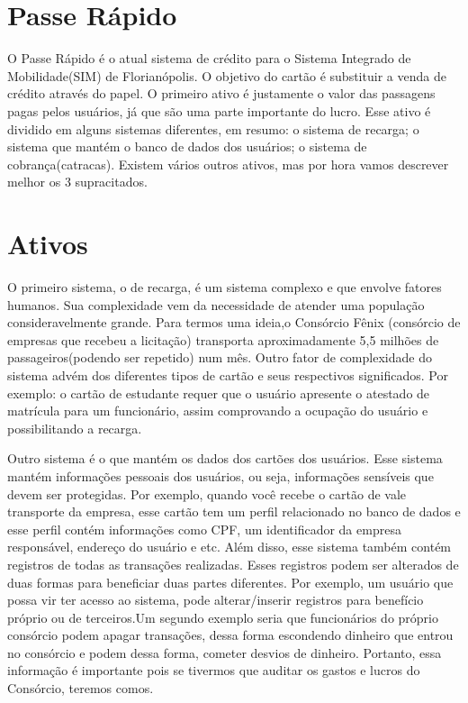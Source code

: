 \documentclass[openany]{ufsctex/ufsctex}
\newcommand{\todo}[1]{{\color{red}{#1}}}
\begin{document}
    \folhaderosto
    \sumario

    \chapter{Passe Rápido}
  
   O Passe Rápido é o atual sistema de crédito para o Sistema Integrado de Mobilidade(SIM) de Florianópolis. O objetivo do cartão é substituir a venda de crédito através do papel. O primeiro ativo é justamente o valor das passagens pagas pelos usuários, já que são uma parte importante do lucro. Esse ativo é dividido em alguns sistemas diferentes, em resumo: o sistema de recarga; o sistema que mantém o banco de dados dos usuários; o sistema de cobrança(catracas). Existem vários outros ativos, mas por hora vamos descrever melhor os 3 supracitados.

   \todo{Descrever qual o sistema escolhido}

   \chapter{Ativos}
  
   O primeiro sistema, o de recarga, é um sistema complexo e que envolve fatores humanos. Sua complexidade vem da necessidade de atender uma população consideravelmente grande. Para termos uma ideia,o Consórcio Fênix (consórcio de empresas que recebeu a licitação) transporta aproximadamente 5,5 milhões de passageiros(podendo ser repetido) num mês. Outro fator de complexidade do sistema advém dos diferentes tipos de cartão e seus respectivos significados. Por exemplo: o cartão de estudante requer que o usuário apresente o atestado de matrícula para um funcionário, assim comprovando a ocupação do usuário e possibilitando a recarga.
  
  
	Outro sistema é o que mantém os dados dos cartões dos usuários. Esse sistema mantém informações pessoais dos usuários, ou seja, informações sensíveis que devem ser protegidas. Por exemplo, quando você recebe o cartão de vale transporte da empresa, esse cartão tem um perfil relacionado no banco de dados e esse perfil contém informações como CPF, um identificador da empresa responsável, endereço do usuário e etc. Além disso, esse sistema também contém registros de todas as transações realizadas. Esses registros podem ser alterados de duas formas para beneficiar duas partes diferentes. Por exemplo, um usuário que possa vir ter acesso ao sistema, pode alterar/inserir registros para benefício próprio ou de terceiros.Um segundo exemplo seria que funcionários do próprio consórcio podem apagar transações, dessa forma escondendo dinheiro que entrou no consórcio e podem dessa forma, cometer desvios de dinheiro. Portanto, essa informação é importante pois se tivermos que auditar os gastos e lucros do Consórcio, teremos comos.
	
\end{document}
